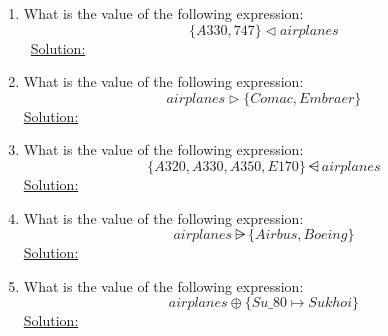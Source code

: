 \begin{enumerate}
  \item What is the value of the following expression:
  \[ \{  A330, 747\}  \lhd airplanes \]\
  \noindent\underline{Solution:}\\
  \item What is the value of the following expression:
  \[ airplanes \rhd \{ Comac, Embraer \} \]
  \noindent\underline{Solution:}\\
  \item What is the value of the following expression:
  \[ \{ A320,A330,A350, E170 \} \ndres airplanes \]
  \noindent\underline{Solution:}\\
  \item What is the value of the following expression:
  \[ airplanes \nrres \{ Airbus, Boeing\} \]
  \noindent\underline{Solution:}\\
  \item What is the value of the following expression:
  \[ airplanes \oplus \{ Su\_80 \mapsto Sukhoi \} \]
  \noindent\underline{Solution:}\\

\end{enumerate}

